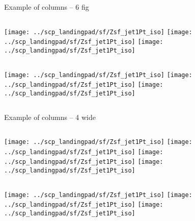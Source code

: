 \documentclass{beamer}
\begin{document}
\begin{frame}{Example of columns -- 6 fig}

	\begin{block}{}  %
		\begin{columns}[c]
			\column{0.33\paperwidth}
				\centering
				\texttt{[image: ../scp\_landingpad/sf/Zsf\_jet1Pt\_iso]}
			\column{0.33\paperwidth}
				\centering
				\texttt{[image: ../scp\_landingpad/sf/Zsf\_jet1Pt\_iso]}
			\column{0.33\paperwidth}
				\centering
				\texttt{[image: ../scp\_landingpad/sf/Zsf\_jet1Pt\_iso]}

		\end{columns}
	\end{block}
	\begin{block}{}  %
		\begin{columns}[c]
			\column{0.33\paperwidth}
				\centering
				\texttt{[image: ../scp\_landingpad/sf/Zsf\_jet1Pt\_iso]}
			\column{0.33\paperwidth}
				\centering
				\texttt{[image: ../scp\_landingpad/sf/Zsf\_jet1Pt\_iso]}
			\column{0.33\paperwidth}
				\centering
				\texttt{[image: ../scp\_landingpad/sf/Zsf\_jet1Pt\_iso]}

		\end{columns}


	\end{block}
\end{frame}


\begin{frame}{Example of columns -- 4 wide}

	\begin{block}{}  %
		\begin{columns}[c]
			\column{0.25\paperwidth}
				\centering
				\texttt{[image: ../scp\_landingpad/sf/Zsf\_jet1Pt\_iso]}
			\column{0.25\paperwidth}
				\centering
				\texttt{[image: ../scp\_landingpad/sf/Zsf\_jet1Pt\_iso]}
			\column{0.25\paperwidth}
				\centering
				\texttt{[image: ../scp\_landingpad/sf/Zsf\_jet1Pt\_iso]}
			\column{0.25\paperwidth}
				\centering
				\texttt{[image: ../scp\_landingpad/sf/Zsf\_jet1Pt\_iso]}
		\end{columns}
	\end{block}
	\begin{block}{}  %
		\begin{columns}[c]
			\column{0.33\paperwidth}
				\centering
				\texttt{[image: ../scp\_landingpad/sf/Zsf\_jet1Pt\_iso]}
			\column{0.33\paperwidth}
				\centering
				\texttt{[image: ../scp\_landingpad/sf/Zsf\_jet1Pt\_iso]}
			\column{0.33\paperwidth}
				\centering
				\texttt{[image: ../scp\_landingpad/sf/Zsf\_jet1Pt\_iso]}

		\end{columns}


	\end{block}
\end{frame}
			
				
	
\end{document}
